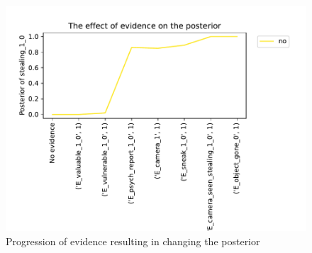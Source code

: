 \begin{enumerate}
\begin{figure}[htbp]
 \centering
\includegraphics[width=0.6\linewidth]{../experiments/GroteMarkt/plots/posterior_base_networkGroteMarkt.pdf}
\caption{ Progression of evidence resulting in changing the posterior}
\label{baseposterior}
\end{figure}%
\end{enumerate}

